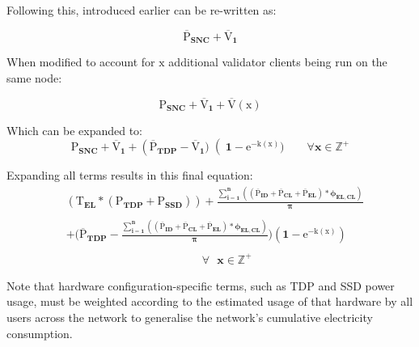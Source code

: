Following this,  introduced earlier can be re-written as:

\begin{equation*}
     \boldsymbol{\overline{\mathrm{P}}_{SNC} +  \overline{\mathrm{V}}_{1} 
} 
\end{equation*}

When modified to account for $\boldsymbol{\mathrm{x }}$ additional validator clients being run on the same node: 

\begin{equation*}
     \boldsymbol{\mathrm{P}_{SNC} +  \overline{\mathrm{V}}_{1} + \mathrm{\overline{V}(\mathrm{x})}} 
\end{equation*}

Which can be expanded to:
\begin{equation}
    \label{eqn:FinalEqnShort}
     \boldsymbol{\mathrm{P}_{SNC} +  \overline{\mathrm{V}}_{1} + {\left(\mathrm{\overline{P}}_{TDP} -\overline{\mathrm{V}}_{1} )\right(1-\mathrm{e}^{-\mathrm{k}(\mathrm{x})}) \qquad \forall x \in \mathbb{Z}^+}} 
\end{equation}

Expanding all terms results in this final equation:
\begin{align}
\label{eqn:FinalEqnLong}
     &\boldsymbol{({\mathrm{T}_{EL} * ({\mathrm{P}_{TDP}} + \mathrm{P}_{SSD})}) +  {\frac{\displaystyle\sum\limits_{i=1}^{n}{ \left({\left(\mathrm{\overline{P}}_{ID} + \mathrm{\overline{P}}_{CL} + \mathrm{\overline{P}}_{EL}\right)} * {\phi_{EL,CL}} \right)}}
{\pi}}}\nonumber \\  \nonumber\\  
     &\boldsymbol{+ {(\mathrm{\overline{P}}_{TDP} - {\frac{\displaystyle\sum\limits_{i=1}^{n}{ \left({\left(\mathrm{\overline{P}}_{ID} + \mathrm{\overline{P}}_{CL} + \mathrm{\overline{P}}_{EL}\right)} * {\phi_{EL,CL}} \right)}}
{\pi}}} ) (1-\mathrm{e}^{-\mathrm{k}(\mathrm{x})})}\\ \nonumber \\    
     &\boldsymbol{\qquad \qquad \qquad \qquad \qquad \qquad \forall \text{ } x \in \mathbb{Z}^+}\nonumber 
\end{align}

Note that hardware configuration-specific terms, such as TDP and SSD power usage, must be weighted according to the estimated usage of that hardware by all users across the network to generalise the network's cumulative electricity consumption. 


